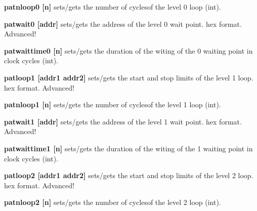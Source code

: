 \begin{DoxyItemize}
\item {\bfseries patnloop0 \mbox{[}n\mbox{]}} sets/gets the number of cyclesof the level 0 loop (int).
\end{DoxyItemize}


\begin{DoxyItemize}
\item {\bfseries patwait0 \mbox{[}addr\mbox{]}} sets/gets the address of the level 0 wait point. hex format. Advanced!
\end{DoxyItemize}


\begin{DoxyItemize}
\item {\bfseries patwaittime0 \mbox{[}n\mbox{]}} sets/gets the duration of the witing of the 0 waiting point in clock cycles (int).
\end{DoxyItemize}


\begin{DoxyItemize}
\item {\bfseries patloop1 \mbox{[}addr1 addr2\mbox{]}} sets/gets the start and stop limits of the level 1 loop. hex format. Advanced!
\end{DoxyItemize}


\begin{DoxyItemize}
\item {\bfseries patnloop1 \mbox{[}n\mbox{]}} sets/gets the number of cyclesof the level 1 loop (int).
\end{DoxyItemize}


\begin{DoxyItemize}
\item {\bfseries patwait1 \mbox{[}addr\mbox{]}} sets/gets the address of the level 1 wait point. hex format. Advanced!
\end{DoxyItemize}


\begin{DoxyItemize}
\item {\bfseries patwaittime1 \mbox{[}n\mbox{]}} sets/gets the duration of the witing of the 1 waiting point in clock cycles (int).
\end{DoxyItemize}


\begin{DoxyItemize}
\item {\bfseries patloop2 \mbox{[}addr1 addr2\mbox{]}} sets/gets the start and stop limits of the level 2 loop. hex format. Advanced!
\end{DoxyItemize}


\begin{DoxyItemize}
\item {\bfseries patnloop2 \mbox{[}n\mbox{]}} sets/gets the number of cyclesof the level 2 loop (int).
\end{DoxyItemize}


